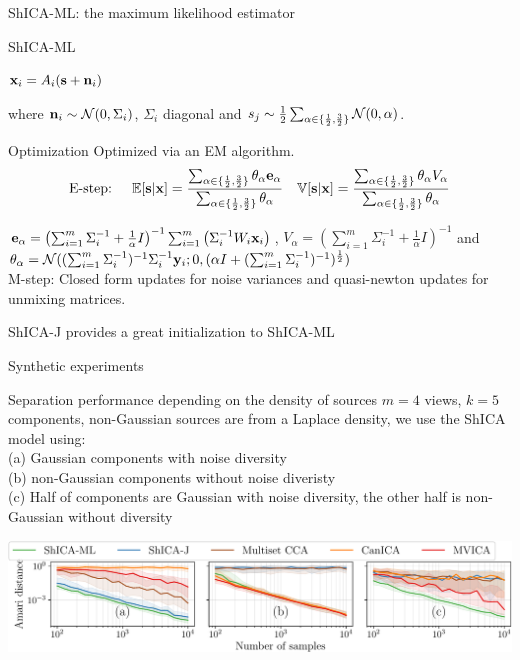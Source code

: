 \documentclass[bigger]{beamer}
\begin{document}
\begin{frame}{ShICA-ML: the maximum likelihood estimator}
  \begin{block}{ShICA-ML}
      \centerline{$\mathbf{x}_i = A_i (\mathbf{s} + \mathbf{n}_i)$} where $\mathbf{n}_i \sim \mathcal{N}(0, \Sigma_i)$, $\Sigma_i$ diagonal and $s_j
  \sim \frac12 \sum_{\alpha \in \{ \frac12, \frac32 \}} \mathcal{N}(0, \alpha)$.
  \end{block}

  \begin{block}{Optimization}
    Optimized via an EM algorithm.
    \vspace{-1em}
    \begin{align*}
      \text{E-step: } && \mathbb{E}[\mathbf{s} | \mathbf{x}] = \frac{\sum_{\alpha \in \{\frac12, \frac32
      \}}\theta_{\alpha} \mathbf{e}_{\alpha}}{\sum_{\alpha \in
      \{\frac12, \frac32 \}}\theta_{\alpha}}
      && 
         \mathbb{V}[\mathbf{s} | \mathbf{x}] = \frac{\sum_{\alpha \in \{\frac12, \frac32
         \}}\theta_{\alpha} V_{\alpha}}{\sum_{\alpha \in
         \{\frac12, \frac32 \}}\theta_{\alpha}} 
    \end{align*}
    \vspace{-1em}

    $\mathbf{e}_{\alpha}= \left(\sum_{i=1}^m \Sigma_i^{-1}  + \frac1{\alpha}I
    \right)^{-1}  \sum_{i=1}^m \left(\Sigma_i^{-1} W_i \mathbf{x}_i \right)$,
    $V_{\alpha} = (\sum_{i=1}^m \Sigma_i^{-1}  + \frac1{\alpha}I)^{-1}$ and
    $\theta_{\alpha} = \mathcal{N}((\sum_{i=1}^m \Sigma_i^{-1})^{-1}
    \Sigma_i^{-1} \mathbf{y}_i; 0, (\alpha I + (\sum_{i=1}^m
    \Sigma_i^{-1})^{-1})^{\frac12})$ \\
    M-step: Closed form updates for noise variances and quasi-newton updates for
    unmixing matrices.
  \end{block}
  ShICA-J provides a great initialization to ShICA-ML
\end{frame}

\begin{frame}{Synthetic experiments}
  \begin{block}{Separation performance depending on the density of sources}
  $m=4$ views, $k=5$ components, non-Gaussian sources are from a Laplace
  density, we use the ShICA model using: \\
  (a) Gaussian components with noise diversity \\
  (b) non-Gaussian components without noise diveristy \\
  (c) Half of components are Gaussian with noise diversity, the other half is
  non-Gaussian without diversity
\end{block}
  \begin{center}
    \includegraphics[width=\textwidth]{./figures/identifiability.pdf}
  \end{center}
\end{frame}
\end{document}

